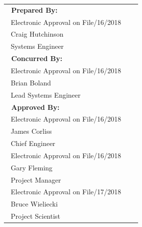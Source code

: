 \documentclass[12pt,oneside,oldfontcommands]{memoir}
\begin{document}
\begin{table}[htbp]
\begin{minipage}{\linewidth}
\centering
\small
\begin{tabulary}{\textwidth}{p{3.325in}p{0.225in}p{2.5in}}
\bfseries{~Prepared By:} & & \\[0.35in]
~Electronic Approval on File\qquad\qquad{}/16/2018\\
\cmidrule(l){1-1}%
~Craig Hutchinson\\
~Systems Engineer\\[0.25in]
\bfseries{~Concurred By:} & & \\[0.35in]
~Electronic Approval on File\qquad\qquad{}/16/2018\\
\cmidrule(l){1-1}%
~Brian Boland & &  \\
~Lead Systems Engineer & &  \\[0.35in]
\bfseries{~Approved By:} & & \\[0.35in]
~Electronic Approval on File\qquad\qquad{}/16/2018\\
\cmidrule(l){1-1}%
~James Corliss & &  \\
~Chief Engineer & &  \\[0.35in]
~Electronic Approval on File\qquad\qquad{}/16/2018\\
\cmidrule(l){1-1}%
~Gary Fleming & &  \\
~Project Manager & &  \\[0.35in]
~Electronic Approval on File\qquad\qquad{}/17/2018\\
\cmidrule(l){1-1}%
~Bruce Wieliecki & &  \\
~Project Scientist & &  \\[0.4in]
\end{tabulary}
\end{minipage}
\end{table}
\clearpage%
\end{document}
